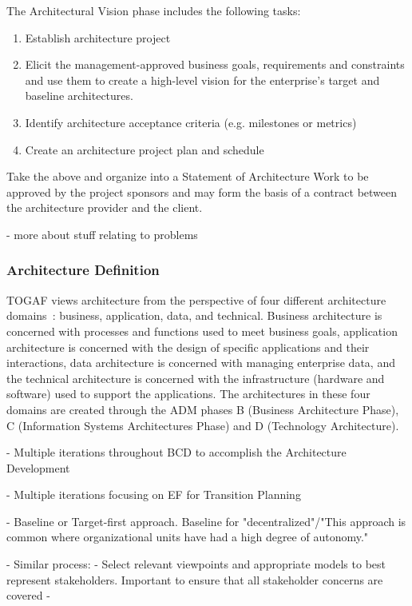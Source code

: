 The Architectural Vision phase includes the following tasks:
\begin{enumerate}
\item Establish architecture project
\item Elicit the management-approved business goals, requirements and constraints and use them to create a high-level vision for the enterprise's target and baseline architectures. 
\item Identify architecture acceptance criteria (e.g. milestones or metrics)
\item Create an architecture project plan and schedule
\end{enumerate}

Take the above and organize into a Statement of Architecture Work to be approved by the project sponsors and may form the basis of a contract between the architecture provider and the client. 

- more about stuff relating to problems


\subsubsection{Architecture Definition}
TOGAF views architecture from the perspective of four different architecture domains~\cite{sessions2007}: business, application, data, and technical. Business architecture is concerned with processes and functions used to meet business goals, application architecture is concerned with the design of specific applications and their interactions, data architecture is concerned with managing enterprise data, and the technical architecture is concerned with the infrastructure (hardware and software) used to support the applications. The architectures in these four domains are created through the ADM phases B (Business Architecture Phase), C (Information Systems Architectures Phase) and D (Technology Architecture).

- Multiple iterations throughout BCD to accomplish the Architecture Development

- Multiple iterations focusing on EF for Transition Planning

- Baseline or Target-first approach. Baseline for "decentralized"/"This approach is common where organizational units have had a high degree of autonomy."

- Similar process:
    - Select relevant viewpoints and appropriate models to best represent stakeholders. Important to ensure that all stakeholder concerns are covered
    - 


